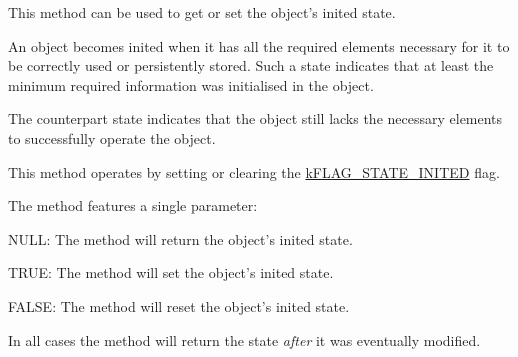 This method can be used to get or set the object's inited state.

An object becomes inited when it has all the required elements necessary for it to be correctly used or persistently stored. Such a state indicates that at least the minimum required information was initialised in the object.

The counterpart state indicates that the object still lacks the necessary elements to successfully operate the object.

This method operates by setting or clearing the \hyperlink{}{k\-F\-L\-A\-G\-\_\-\-S\-T\-A\-T\-E\-\_\-\-I\-N\-I\-T\-E\-D} flag.

The method features a single parameter\-:


\begin{DoxyItemize}
\item {\ttfamily N\-U\-L\-L}\-: The method will return the object's inited state. 
\item {\ttfamily T\-R\-U\-E}\-: The method will set the object's inited state. 
\item {\ttfamily F\-A\-L\-S\-E}\-: The method will reset the object's inited state. 
\end{DoxyItemize}

In all cases the method will return the state {\itshape after} it was eventually modified.


